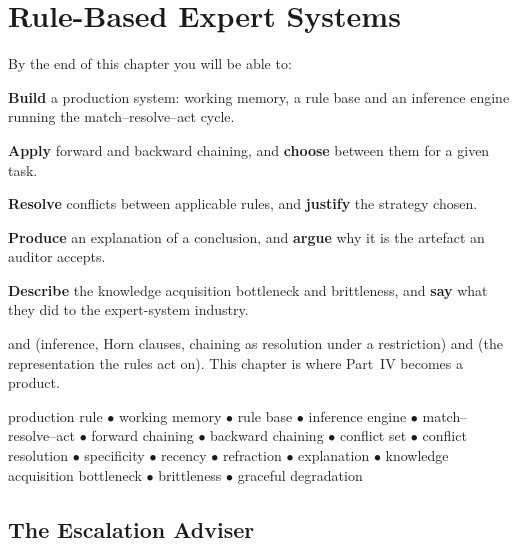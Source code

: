 \chapter{Rule-Based Expert Systems}\label{ch:expert}

\begin{outcomes}
By the end of this chapter you will be able to:
\begin{tight}
  \item \textbf{Build} a production system: working memory, a rule base and an
        inference engine running the match--resolve--act cycle.
  \item \textbf{Apply} forward and backward chaining, and \textbf{choose} between
        them for a given task.
  \item \textbf{Resolve} conflicts between applicable rules, and \textbf{justify}
        the strategy chosen.
  \item \textbf{Produce} an explanation of a conclusion, and \textbf{argue} why it
        is the artefact an auditor accepts.
  \item \textbf{Describe} the knowledge acquisition bottleneck and brittleness, and
        \textbf{say} what they did to the expert-system industry.
\end{tight}
\end{outcomes}

\begin{prereq}
 and  (inference, Horn clauses, chaining as
resolution under a restriction) and  (the representation the rules act
on). This chapter is where Part~IV becomes a product.
\end{prereq}

\begin{keyterms}
production rule $\bullet$ working memory $\bullet$ rule base $\bullet$ inference
engine $\bullet$ match--resolve--act $\bullet$ forward chaining $\bullet$ backward
chaining $\bullet$ conflict set $\bullet$ conflict resolution $\bullet$ specificity
$\bullet$ recency $\bullet$ refraction $\bullet$ explanation $\bullet$ knowledge
acquisition bottleneck $\bullet$ brittleness $\bullet$ graceful degradation
\end{keyterms}

\section{The Escalation Adviser}

